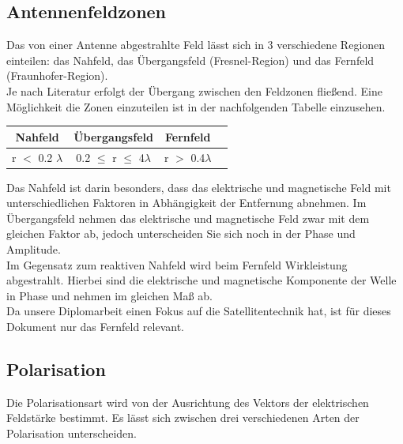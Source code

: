 \subsection{Antennenfeldzonen}
Das von einer Antenne abgestrahlte Feld lässt sich in 3 verschiedene Regionen einteilen: das Nahfeld, das Übergangsfeld (Fresnel-Region) und das Fernfeld (Fraunhofer-Region).\\

Je nach Literatur erfolgt der Übergang zwischen den Feldzonen fließend. Eine Möglichkeit die Zonen einzuteilen ist in der nachfolgenden Tabelle einzusehen.

\begin{center}
	\begin{tabular}[h]{|c|c|c| p{}}
		\hline
		Nahfeld & Übergangsfeld & Fernfeld\\
		\hline
		r $<$ 0.2 $\lambda$ & 0.2 $\leq$ r $\leq$ 4$\lambda$ & r $>$ 0.4$\lambda$\\
		\hline
	\end{tabular}
\end{center}

Das Nahfeld ist darin besonders, dass das elektrische und magnetische Feld mit unterschiedlichen Faktoren in Abhängigkeit der Entfernung abnehmen. Im Übergangsfeld nehmen das elektrische und magnetische Feld zwar mit dem gleichen Faktor ab, jedoch unterscheiden Sie sich noch in der Phase und Amplitude.\\

Im Gegensatz zum reaktiven Nahfeld wird beim Fernfeld Wirkleistung abgestrahlt. Hierbei sind die elektrische und magnetische Komponente der Welle in Phase und nehmen im gleichen Maß ab.\\

Da unsere Diplomarbeit einen Fokus auf die Satellitentechnik hat, ist für dieses Dokument nur das Fernfeld relevant. 

\subsection{Polarisation}
Die Polarisationsart wird von der Ausrichtung des Vektors der elektrischen Feldstärke bestimmt. Es lässt sich zwischen drei verschiedenen Arten der Polarisation unterscheiden.\\


